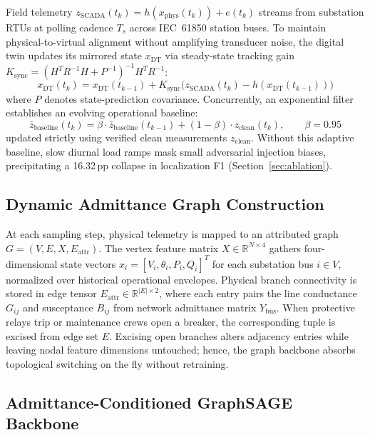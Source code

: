 \documentclass[runningheads]{llncs}
\begin{document}
Field telemetry $z_{\mathrm{SCADA}}(t_{k}) = h(x_{\mathrm{phys}}(t_{k})) + e(t_{k})$ streams from substation RTUs at polling cadence $T_{s}$ across IEC~61850 station buses.
To maintain physical-to-virtual alignment without amplifying transducer noise, the digital twin updates its mirrored state $x_{\mathrm{DT}}$ via steady-state tracking gain $K_{\mathrm{sync}} = (H^{T}R^{-1}H + P^{-1})^{-1}H^{T}R^{-1}$:
\begin{equation}
x_{\mathrm{DT}}(t_{k}) = x_{\mathrm{DT}}(t_{k-1}) + K_{\mathrm{sync}} \bigl(z_{\mathrm{SCADA}}(t_{k}) - h(x_{\mathrm{DT}}(t_{k-1}))\bigr)
\label{eq:dt_sync}
\end{equation}
where $P$ denotes state-prediction covariance.
Concurrently, an exponential filter establishes an evolving operational baseline:
\begin{equation}
\bar{z}_{\mathrm{baseline}}(t_{k}) = \beta \cdot \bar{z}_{\mathrm{baseline}}(t_{k-1}) + (1 - \beta) \cdot z_{\mathrm{clean}}(t_{k}), \qquad \beta = 0.95
\label{eq:rolling_baseline}
\end{equation}
updated strictly using verified clean measurements $z_{\mathrm{clean}}$.
Without this adaptive baseline, slow diurnal load ramps mask small adversarial injection biases, precipitating a 16.32\,pp collapse in localization F1 (Section~\ref{sec:ablation}).

\subsection{Dynamic Admittance Graph Construction}

At each sampling step, physical telemetry is mapped to an attributed graph $G = (V, E, X, E_{\mathrm{attr}})$.
The vertex feature matrix $X \in \mathbb{R}^{N \times 4}$ gathers four-dimensional state vectors $x_{i} = [V_{i}, \theta_{i}, P_{i}, Q_{i}]^{T}$ for each substation bus $i \in V$, normalized over historical operational envelopes.
Physical branch connectivity is stored in edge tensor $E_{\mathrm{attr}} \in \mathbb{R}^{|E| \times 2}$, where each entry pairs the line conductance $G_{ij}$ and susceptance $B_{ij}$ from network admittance matrix $Y_{\mathrm{bus}}$.
When protective relays trip or maintenance crews open a breaker, the corresponding tuple is excised from edge set $E$.
Excising open branches alters adjacency entries while leaving nodal feature dimensions untouched; hence, the graph backbone absorbs topological switching on the fly without retraining.

\subsection{Admittance-Conditioned GraphSAGE Backbone}
\end{document}
